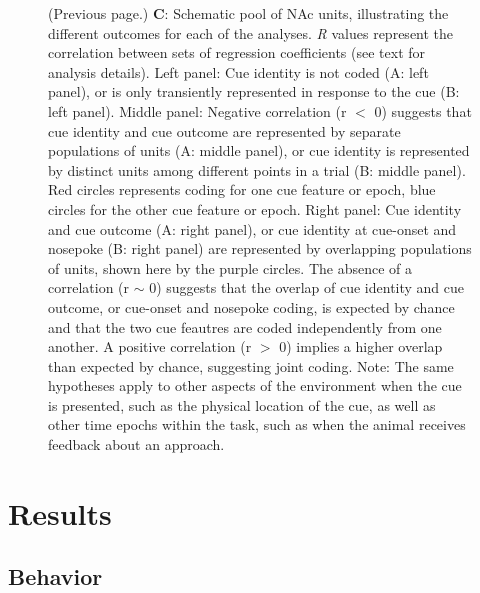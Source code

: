 \documentclass[11pt]{article}
\newcommand{\bsf}[1]{\textbf{#1}}
\begin{document}
\addtocounter{figure}{-1}
\begin{figure} [t!]
  \caption{(Previous page.) \bsf{C}: Schematic pool of NAc units,
    illustrating the different outcomes for each of the analyses. {\it
      R} values represent the correlation between sets of regression
    coefficients (see text for analysis details). Left panel: Cue
    identity is not coded (A: left panel), or is only transiently
    represented in response to the cue (B: left panel). Middle panel:
    Negative correlation (r $<$ 0) suggests that cue identity and cue
    outcome are represented by separate populations of units (A:
    middle panel), or cue identity is represented by distinct units
    among different points in a trial (B: middle panel). Red circles
    represents coding for one cue feature or epoch, blue circles for
    the other cue feature or epoch. Right panel: Cue identity and cue
    outcome (A: right panel), or cue identity at cue-onset and
    nosepoke (B: right panel) are represented by overlapping
    populations of units, shown here by the purple circles. The
    absence of a correlation (r $\sim$ 0) suggests that the overlap of
    cue identity and cue outcome, or cue-onset and nosepoke coding, is
    expected by chance and that the two cue feautres are coded independently from one another. A positive correlation (r $>$ 0)
    implies a higher overlap than expected by chance, suggesting joint coding. Note: The same hypotheses apply to other aspects of the environment when the cue is presented, such as the physical location of the cue, as well as other time epochs within the task, such as when the animal receives feedback about an approach.}%
\end{figure}

\section*{Results}

\subsection*{Behavior}
\end{document}
